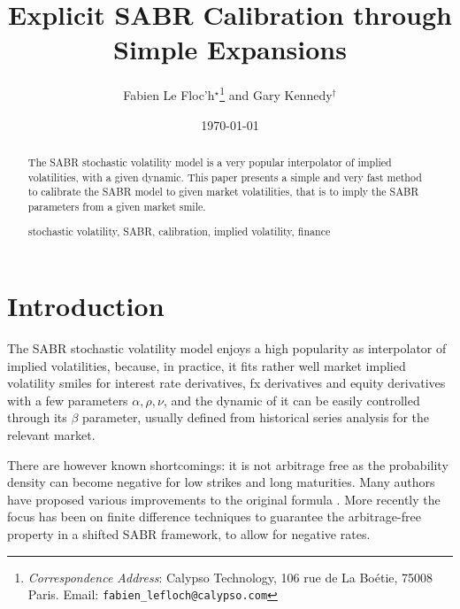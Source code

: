\documentclass[]{rAMF2e}
\begin{document}
\doi{}
\issn{}  \issnp{}
\def\jobtag{}
\jname{}


\title{Explicit SABR Calibration through Simple Expansions}
\author{Fabien {Le Floc'h}$^\star$\thanks{{\em{Correspondence Address}}: Calypso Technology, 106 rue de La Bo\'{e}tie, 75008 Paris. Email: \texttt{fabien\_lefloch@calypso.com} \vspace{6pt}} and Gary Kennedy$^\dag$}
%
\date{\today}

\maketitle
\newcommand{\sgn}{\mathop{\mathrm{sgn}}}
\begin{abstract}
The SABR stochastic volatility model is a very popular interpolator of implied volatilities, with a given dynamic. This paper presents a simple and very fast method to calibrate the SABR model to given market volatilities, that is to imply the SABR parameters from a given market smile.
\begin{keywords}stochastic volatility, SABR, calibration, implied volatility, finance\end{keywords}
\end{abstract}

\section{Introduction}
The SABR stochastic volatility model \citep{hagan2002managing} enjoys a high popularity as interpolator of implied volatilities, because, in practice, it fits rather well market implied volatility smiles for interest rate derivatives, fx derivatives and equity derivatives with a few parameters $\alpha, \rho, \nu$, and the dynamic of it can be easily controlled through its $\beta$ parameter, usually defined from historical series analysis for the relevant market.

There are however known shortcomings: it is not arbitrage free as the probability density can become negative for low strikes and long maturities. Many authors have proposed various improvements to the original formula \citep{obloj2008fine, johnson2009arbitrage, paulot2009asymptotic, benaim2008arbitrage}. More recently the focus has been on finite difference techniques to guarantee the arbitrage-free property \citep{hagan2013arbitrage,lefloch2014fdmsabr} in a shifted SABR framework, to allow for negative rates. 
\end{document}
